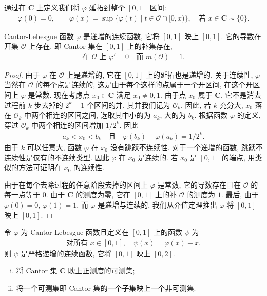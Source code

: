 \documentclass[../../main.tex]{subfiles}
\begin{document}
通过在 $\mathbf{C}$ 上定义我们将 $\varphi$ 延拓到整个 $[0,1]$ 区间:
\begin{align*}
\varphi(0)=0,\qquad\varphi(x)=\sup\{\varphi(t)\mid t\in\mathcal{O}\cap[0,x)\},\quad\text{若 }x\in\mathbf{C}\sim\{0\}.
\end{align*}

\begin{proposition}\label{proposition:ch02-Cantor连续}
Cantor-Lebesgue 函数 $\varphi$ 是递增的连续函数, 它将 $[0,1]$ 映上 $[0,1]$. 它的导数在开集 $\mathcal{O}$ 上存在, 即 Cantor 集在 $[0,1]$ 上的补集存在,
\begin{align*}
\text{在 }\mathcal{O}\text{ 上 }\varphi'=0\quad\text{而 }m(\mathcal{O})=1.
\end{align*}
\end{proposition}

\begin{proof}
由于 $\varphi$ 在 $\mathcal{O}$ 上是递增的, 它在 $[0,1]$ 上的延拓也是递增的. 关于连续性, $\varphi$ 当然在 $\mathcal{O}$ 的每个点是连续的, 这是由于每个这样的点属于一个开区间, 在这个开区间上 $\varphi$ 是常数. 现在考虑点 $x_{0}\in\mathbf{C}$ 满足 $x_{0}\neq 0,1$. 由于点 $x_{0}$ 属于 $\mathbf{C}$, 它不是消去过程前 $k$ 步去掉的 $2^{k}-1$ 个区间的并, 其并我们记为 $\mathcal{O}_{k}$. 因此, 若 $k$ 充分大, $x_{0}$ 落在 $\mathcal{O}_{k}$ 中两个相连的区间之间, 选取其中小的为 $a_{k}$, 大的为 $b_{k}$. 根据函数 $\varphi$ 的定义, 穿过 $\mathcal{O}_{k}$ 中两个相连的区间增加 $1/2^{k}$. 因此
\begin{align*}
a_{k}<x_{0}<b_{k}\quad\text{且}\quad\varphi(b_{k})-\varphi(a_{k})=1/2^{k}.
\end{align*}
由于 $k$ 可以任意大, 函数 $\varphi$ 在 $x_{0}$ 没有跳跃不连续性. 对于一个递增的函数, 跳跃不连续性是仅有的不连续类型. 因此 $\varphi$ 在 $x_{0}$ 是连续的. 若 $x_{0}$ 是 $[0,1]$ 的端点, 用类似的方法可证明在 $x_{0}$ 的连续性.

由于在每个去除过程的任意阶段去掉的区间上 $\varphi$ 是常数, 它的导数存在且在 $\mathcal{O}$ 的每一点等于 $0$. 由于 $\mathbf{C}$ 的测度为零, 它在 $[0,1]$ 上的补 $\mathcal{O}$ 的测度为 $1$. 最后, 由于 $\varphi(0)=0$, $\varphi(1)=1$, 而 $\varphi$ 是递增与连续的, 我们从介值定理推出 $\varphi$ 将 $[0,1]$ 映上 $[0,1]$.
\end{proof}

\begin{proposition}\label{proposition:ch02-Cantor映射}
令 $\varphi$ 为 Cantor-Lebesgue 函数且定义在 $[0,1]$ 上的函数 $\psi$ 为
\begin{align*}
\text{对所有 }x\in[0,1],\quad\psi(x)=\varphi(x)+x.
\end{align*}
则 $\psi$ 是严格递增的连续函数, 它将 $[0,1]$ 映上 $[0,2]$.
\begin{enumerate}[(i)]
\item 将 Cantor 集 $\mathbf{C}$ 映上正测度的可测集;
\item 将一个可测集即 Cantor 集的一个子集映上一个非可测集.
\end{enumerate}
\end{proposition}
\end{document}
